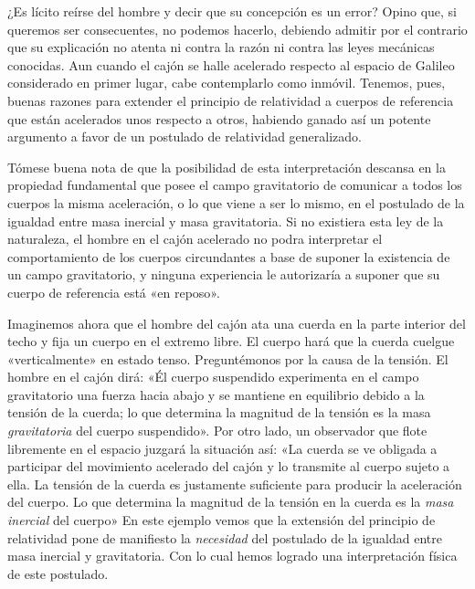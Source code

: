 \documentclass[spanish]{book}
\begin{document}
¿Es lícito reírse del hombre y decir que su concepción es un error? Opino que, si
queremos ser consecuentes, no podemos hacerlo, debiendo admitir por el contrario
que su explicación no atenta ni contra la razón ni contra las leyes mecánicas
conocidas. Aun cuando el cajón se halle acelerado respecto al espacio de Galileo
considerado en primer lugar, cabe contemplarlo como inmóvil. Tenemos, pues, buenas
razones para extender el principio de relatividad a cuerpos de referencia que están
acelerados unos respecto a otros, habiendo ganado así un potente argumento a
favor de un postulado de relatividad generalizado.

Tómese buena nota de que la posibilidad de esta interpretación descansa en la
propiedad fundamental que posee el campo gravitatorio de comunicar a todos los
cuerpos la misma aceleración, o lo que viene a ser lo mismo, en el postulado de la
igualdad entre masa inercial y masa gravitatoria. Si no existiera esta ley de la naturaleza,
el hombre en el cajón acelerado no podra interpretar el comportamiento de los
cuerpos circundantes a base de suponer la existencia de un campo gravitatorio, y
ninguna experiencia le autorizaría a suponer que su cuerpo de referencia está «en
reposo».

Imaginemos ahora que el hombre del cajón ata una cuerda en la parte interior del
techo y fija un cuerpo en el extremo libre. El cuerpo hará que la cuerda cuelgue
«verticalmente» en estado tenso. Preguntémonos por la causa de la tensión. El hombre
en el cajón dirá: «Él cuerpo suspendido experimenta en el campo gravitatorio una fuerza
hacia abajo y se mantiene en equilibrio debido a la tensión de la cuerda; lo que
determina la magnitud de la tensión es la masa \textit{gravitatoria} del cuerpo suspendido».
Por otro lado, un observador que flote libremente en el espacio juzgará la situación así:
«La cuerda se ve obligada a participar del movimiento acelerado del cajón y lo
transmite al cuerpo sujeto a ella. La tensión de la cuerda es justamente suficiente para
producir la aceleración del cuerpo. Lo que determina la magnitud de la tensión en la
cuerda es la \textit{masa inercial} del cuerpo» En este ejemplo vemos que la extensión del
principio de relatividad pone de manifiesto la \textit{necesidad} del postulado de la igualdad
entre masa inercial y gravitatoria. Con lo cual hemos logrado una interpretación física
de este postulado.
\end{document}
